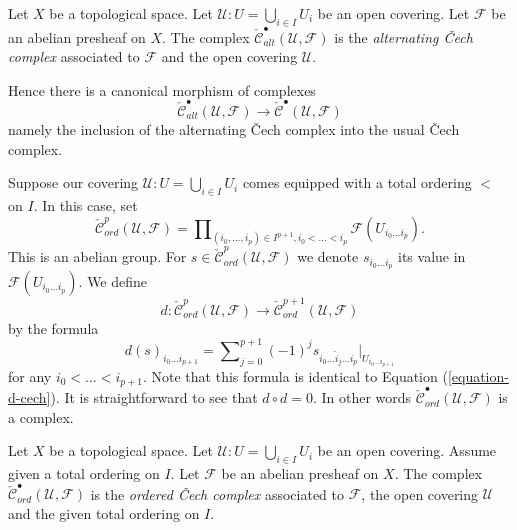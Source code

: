 \begin{definition}
\label{definition-alternating-cech-complex}
Let $X$ be a topological space. Let $\mathcal{U} : U = \bigcup_{i \in I} U_i$
be an open covering. Let $\mathcal{F}$ be an abelian presheaf on $X$.
The complex $\check{\mathcal{C}}_{alt}^\bullet(\mathcal{U}, \mathcal{F})$
is the {\it alternating {\v C}ech complex} associated to $\mathcal{F}$ and the
open covering $\mathcal{U}$.
\end{definition}

\noindent
Hence there is a canonical morphism of complexes
$$
\check{\mathcal{C}}_{alt}^\bullet(\mathcal{U}, \mathcal{F})
\longrightarrow
\check{\mathcal{C}}^\bullet(\mathcal{U}, \mathcal{F})
$$
namely the inclusion of the alternating {\v C}ech complex into the
usual {\v C}ech complex.

\medskip\noindent
Suppose our covering $\mathcal{U} : U = \bigcup_{i \in I} U_i$ comes
equipped with a total ordering $<$ on $I$. In this case, set
$$
\check{\mathcal{C}}_{ord}^p(\mathcal{U}, \mathcal{F})
=
\prod\nolimits_{(i_0, \ldots, i_p) \in I^{p + 1}, i_0 < \ldots < i_p}
\mathcal{F}(U_{i_0\ldots i_p}).
$$
This is an abelian group. For
$s \in \check{\mathcal{C}}_{ord}^p(\mathcal{U}, \mathcal{F})$ we denote
$s_{i_0\ldots i_p}$ its value in $\mathcal{F}(U_{i_0\ldots i_p})$.
We define
$$
d : \check{\mathcal{C}}_{ord}^p(\mathcal{U}, \mathcal{F})
\longrightarrow
\check{\mathcal{C}}_{ord}^{p + 1}(\mathcal{U}, \mathcal{F})
$$
by the formula
$$
d(s)_{i_0\ldots i_{p + 1}}
=
\sum\nolimits_{j = 0}^{p + 1}
(-1)^j
s_{i_0\ldots \hat i_j \ldots i_p}|_{U_{i_0\ldots i_{p + 1}}}
$$
for any $i_0 < \ldots < i_{p + 1}$. Note that this formula is identical
to Equation (\ref{equation-d-cech}).
It is straightforward to see that $d \circ d = 0$. In other words
$\check{\mathcal{C}}_{ord}^\bullet(\mathcal{U}, \mathcal{F})$ is a complex.

\begin{definition}
\label{definition-ordered-cech-complex}
Let $X$ be a topological space.
Let $\mathcal{U} : U = \bigcup_{i \in I} U_i$ be an open covering.
Assume given a total ordering on $I$.
Let $\mathcal{F}$ be an abelian presheaf on $X$.
The complex $\check{\mathcal{C}}_{ord}^\bullet(\mathcal{U}, \mathcal{F})$
is the {\it ordered {\v C}ech complex} associated to $\mathcal{F}$, the
open covering $\mathcal{U}$ and the given total ordering on $I$.
\end{definition}


